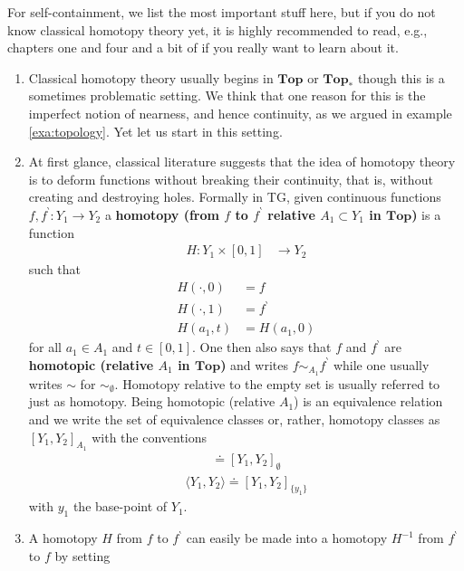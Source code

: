 For self-containment, we list the most important stuff here, but if you do not know classical homotopy theory yet, it is highly recommended to read, e.g., \cite{8b5861fc} chapters one and four and a bit of \cite{78202e13} if you really want to learn about it.
\begin{enumerate}
\item[$\bullet$]
Classical homotopy theory usually begins in $\mathbf{Top}$ or $\mathbf{Top}_{\ast}$ though this is a sometimes problematic setting.
We think that one reason for this is the imperfect notion of nearness, and hence continuity, as we argued in example \ref{exa:topology}.
Yet let us start in this setting.
\item[$\bullet$]
At first glance, classical literature suggests that the idea of homotopy theory is to deform functions without breaking their continuity, that is, without creating and destroying {\glqq}holes{\grqq}.
Formally in TG, given continuous functions $f,f^{\backprime} \colon Y_{1} \rightarrow Y_{2}$ a \textbf{homotopy (from $f$ to $f^{\backprime}$ relative $A_{1} \subset Y_{1}$ in $\mathbf{Top}$)} is a function
\begin{align*}
  H
  \colon
  Y_{1}
  \times
  [0,1]
  &\rightarrow
  Y_{2}
\end{align*}
such that
\begin{align*}
  H(\cdot,0)
  &=
  f
  \\
  H(\cdot,1)
  &=
  f^{\backprime}
  \\
  H(a_{1},t)
  &=
  H(a_{1},0)
\end{align*}
for all $a_{1} \in A_{1}$ and $t \in [0,1]$.
One then also says that $f$ and $f^{\backprime}$ are \textbf{homotopic (relative $A_{1}$ in $\mathbf{Top}$)} and writes $f \sim_{A_{1}} f^{\backprime}$ while one usually writes $\sim$ for $\sim_{\emptyset}$.
Homotopy relative to the empty set is usually referred to just as homotopy.
Being homotopic (relative $A_{1}$) is an equivalence relation and we write the set of equivalence classes or, rather, homotopy classes as $[Y_{1},Y_{2}]_{A_{1}}$ with the conventions
\begin{align*}
  [Y_{1},Y_{2}]
  \doteq
  [Y_{1},Y_{2}]_{\emptyset}
\end{align*}
\begin{align*}
  \langle
    Y_{1},
    Y_{2}
  \rangle
  \doteq
  [Y_{1},Y_{2}]_{\lbrace y_{1} \rbrace}
\end{align*}
with $y_{1}$ the base-point of $Y_{1}$.
\item[$\bullet$]
A homotopy $H$ from $f$ to $f^{\backprime}$ can easily be made into a homotopy $H^{-1}$ from $f^{\backprime}$ to $f$ by setting

\end{enumerate}
